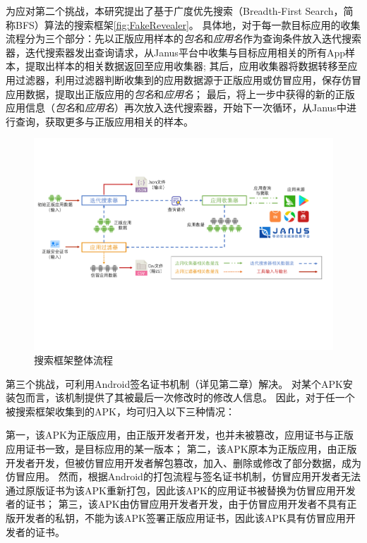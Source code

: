 为应对第二个挑战，本研究提出了基于广度优先搜索（Breadth-First Search，简称BFS）算法的搜索框架\autoref{fig:FakeRevealer}。
具体地，对于每一款目标应用的收集流程分为三个部分：先以正版应用样本的\emph{包名}和\emph{应用名}作为查询条件放入迭代搜索器，迭代搜索器发出查询请求，从Janus平台中收集与目标应用相关的所有App样本，提取出样本的相关数据返回至应用收集器;
其后，应用收集器将数据转移至应用过滤器，利用过滤器判断收集到的应用数据源于正版应用或仿冒应用，保存仿冒应用数据，提取出正版应用的\emph{包名}和\emph{应用名}；
最后，将上一步中获得的新的正版应用信息（\emph{包名}和\emph{应用名}）再次放入迭代搜索器，开始下一次循环，从Janus中进行查询，获取更多与正版应用相关的样本。

\begin{figure}[htbp]
	\centering
	\includegraphics[width=\textwidth]{./Figures/edwin-fakerevealer}
	\caption{搜索框架整体流程}
	\label{fig:FakeRevealer}
	\vspace{-3mm}
\end{figure}

第三个挑战，可利用Android签名证书机制（详见第二章）解决。
对某个APK安装包而言，该机制提供了其被最后一次修改时的修改人信息。
因此，对于任一个被搜索框架收集到的APK，均可归入以下三种情况：

第一，该APK为正版应用，由正版开发者开发，也并未被篡改，应用证书与正版应用证书一致，是目标应用的某一版本；
第二，该APK原本为正版应用，由正版开发者开发，但被仿冒应用开发者解包篡改，加入、删除或修改了部分数据，成为仿冒应用。
然而，根据Android的打包流程与签名证书机制，仿冒应用开发者无法通过原版证书为该APK重新打包，因此该APK的应用证书被替换为仿冒应用开发者的证书；
第三，该APK由仿冒应用开发者开发，由于仿冒应用开发者不具有正版开发者的私钥，不能为该APK签署正版应用证书，因此该APK具有仿冒应用开发者的证书。

